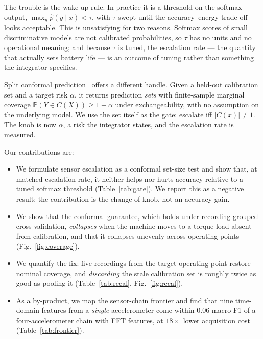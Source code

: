 \documentclass[conference,10pt]{IEEEtran}          %
\begin{document}
The trouble is the wake-up rule. In practice it is a threshold on the
softmax output, $\max_y \hat p(y \mid x) < \tau$, with $\tau$ swept until
the accuracy--energy trade-off looks acceptable. This is unsatisfying for
two reasons. Softmax scores of small discriminative models are not
calibrated probabilities, so $\tau$ has no units and no operational
meaning; and because $\tau$ is tuned, the escalation rate --- the quantity
that actually sets battery life --- is an outcome of tuning rather than
something the integrator specifies.

Split conformal prediction~\cite{papadopoulos2002,vovk2005,lei2018,angelopoulos2023}
offers a different handle. Given a held-out calibration set and a target
risk $\alpha$, it returns prediction \emph{sets} with finite-sample
marginal coverage $\mathbb{P}(Y \in C(X)) \geq 1-\alpha$ under
exchangeability, with no assumption on the underlying model. We use the
set itself as the gate: escalate iff $|C(x)| \neq 1$. The knob is now
$\alpha$, a risk the integrator states, and the escalation rate is
measured.

Our contributions are:
\begin{itemize}\itemsep1pt
\item We formulate sensor escalation as a conformal set-size test and show
      that, at matched escalation rate, it neither helps nor hurts accuracy
      relative to a tuned softmax threshold (Table~\ref{tab:gate}). We
      report this as a negative result: the contribution is the change of
      knob, not an accuracy gain.
\item We show that the conformal guarantee, which holds under
      recording-grouped cross-validation, \emph{collapses} when the machine
      moves to a torque load absent from calibration, and that it collapses
      unevenly across operating points (Fig.~\ref{fig:coverage}).
\item We quantify the fix: five recordings from the target operating point
      restore nominal coverage, and \emph{discarding} the stale calibration
      set is roughly twice as good as pooling it
      (Table~\ref{tab:recal}, Fig.~\ref{fig:recal}).
\item As a by-product, we map the sensor-chain frontier and find that nine
      time-domain features from a \emph{single} accelerometer come within
      $0.06$ macro-F1 of a four-accelerometer chain with FFT features, at
      $18\times$ lower acquisition cost (Table~\ref{tab:frontier}).
\end{itemize}
\end{document}

